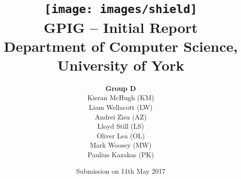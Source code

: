 \documentclass[twoside,a4paper,12pt]{article}
\begin{document}
	\title{ 
	\vspace{1cm}
	{\texttt{[image: images/shield]}} \\
	\vspace{1.5cm}
	{GPIG -- Initial Report}\\
	{\large Department of Computer Science, University of York}\\
	\vspace{1cm}
    }
    \author{\textbf{Group D} \\ Kieran McHugh (KM) \\ Liam Wellacott (LW) \\ Andrei Zisu (AZ) \\ Lloyd Still (LS) \\ Oliver Lea (OL) \\ Mark Woosey (MW) \\ Paulius Kazakas (PK) }
    \date{Submission on 11th May 2017}
    \maketitle 

    \thispagestyle{empty}
    
    \setlength{\parskip}{0.5em}
    
    \newpage
    \tableofcontents
    
	\newpage

	

	
	
	\newpage
	
	
	
	
	
	
	\newpage
	
		
	\newpage
	
	
	
	
	\newpage
	
	
	\newpage
	
		
	\newpage

	
	
\end{document}
